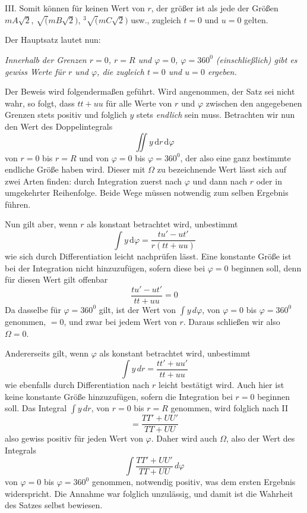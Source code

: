 III. Somit können für keinen Wert von $r$, der größer ist als jede der Größen $mA\surd2$, $\surd(mB\surd2)$, ${}^3\!\surd(mC\surd2)$ usw., zugleich $t=0$ und $u=0$ gelten.

Der Hauptsatz lautet nun:

\emph{Innerhalb der Grenzen $r=0$, $r=R$ und $\varphi=0$, $\varphi=360^0$ (einschließlich) gibt es gewiss Werte für $r$ und $\varphi$, die zugleich $t=0$ und $u=0$ ergeben.}

Der Beweis wird folgendermaßen geführt. Wird angenommen, der Satz sei nicht wahr, so folgt, dass $tt+uu$ für alle Werte von $r$ und $\varphi$ zwischen den angegebenen Grenzen stets positiv und folglich $y$ stets \emph{endlich} sein muss. Betrachten wir nun den Wert des Doppelintegrals
\[
\iint y\,\mathrm{d}r\,\mathrm{d}\varphi
\]
von $r=0$ bis $r=R$ und von $\varphi=0$ bis $\varphi=360^0$, der also eine ganz bestimmte endliche Größe haben wird. Dieser mit $\Omega$ zu bezeichnende Wert lässt sich auf zwei Arten finden: durch Integration zuerst nach $\varphi$ und dann nach $r$ oder in umgekehrter Reihenfolge. Beide Wege müssen notwendig zum selben Ergebnis führen.

Nun gilt aber, wenn $r$ als konstant betrachtet wird, unbestimmt
\[
\int y\,\mathrm{d}\varphi=\frac{tu'-ut'}{r(tt+uu)}
\]
wie sich durch Differentiation leicht nachprüfen lässt. Eine konstante Größe
ist bei der Integration nicht hinzuzufügen, sofern diese bei $\varphi=0$ beginnen soll, denn für diesen Wert gilt offenbar
\[
\frac{tu'-ut'}{tt+uu}=0
\]
Da dasselbe für $\varphi=360^0$ gilt, ist der Wert von $\int y\,d\varphi$, von $\varphi=0$ bis $\varphi=360^0$ genommen, $=0$, und zwar bei jedem Wert von $r$. Daraus schließen wir also $\Omega=0$.

Andererseits gilt, wenn $\varphi$ als konstant betrachtet wird, unbestimmt
\[
\int y\,dr=\frac{tt'+uu'}{tt+uu}
\]
wie ebenfalls durch Differentiation nach $r$ leicht bestätigt wird. Auch hier ist keine konstante Größe hinzuzufügen, sofern die Integration bei $r=0$ beginnen soll. Das Integral $\int y\,dr$, von $r=0$ bis $r=R$ genommen, wird folglich nach II
\[
=\frac{TT'+UU'}{TT+UU}
\]
also gewiss positiv für jeden Wert von $\varphi$. Daher wird auch $\Omega$, also der Wert des Integrals
\[
\int\frac{TT'+UU'}{TT+UU}\,d\varphi
\]
von $\varphi=0$ bis $\varphi=360^0$ genommen, notwendig positiv, was dem ersten Ergebnis widerspricht. Die Annahme war folglich unzulässig, und damit ist die Wahrheit des Satzes selbst bewiesen.

